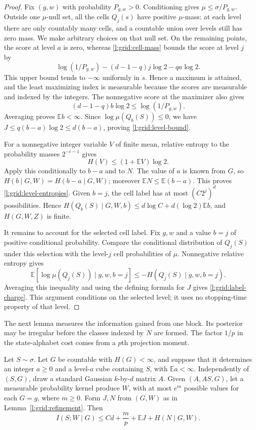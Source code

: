 \begin{proof}
Fix $(g,w)$ with probability $P_{g,w}>0$.  Conditioning gives
$\mu\le\sigma/P_{g,w}$.  Outside one $\mu$-null set, all the cells
$Q_j(s)$ have positive $\mu$-mass: at each level there are only countably
many cells, and a countable union over levels still has zero mass.
We make arbitrary choices on that null set.  On the remaining points,
the score at level $a$ is zero, whereas \eqref{l:grid:cell-mass} bounds
the score at level $j$ by
\[
 \log(1/P_{g,w})-(d-1-q)j\log2-qa\log2.
\]
This upper bound tends to $-\infty$ uniformly in $s$.  Hence a maximum
is attained, and the least maximizing index is measurable because the
scores are measurable and indexed by the integers.  The nonnegative
score at the maximizer also gives
\[
 (d-1-q)b\log2\le\log(1/P_{g,w}).
\]
Averaging proves $\mathbb E b<\infty$.  Since
$\log\mu(Q_b(S))\le0$, we have
$J\le q(b-a)\log2\le d(b-a)$, proving \eqref{l:grid:level-bound}.

For a nonnegative integer variable $V$ of finite mean, relative entropy
to the probability masses $2^{-i-1}$ gives
\[
 H(V)\le(1+\mathbb E V)\log2.
\]
Apply this conditionally to $b-a$ and to $N$.  The value of $a$ is
known from $G$, so $H(b\mid G,W)=H(b-a\mid G,W)$; moreover
$\mathbb E N\le\mathbb E(b-a)$.  This proves
\eqref{l:grid:level-entropies}.  Given $b=j$, the cell label has at
most $(C2^j)^d$ possibilities.  Hence
$H(Q_b(S)\mid G,W,b)\le d\log C+d(\log2)\mathbb E b$, and
$H(G,W,Z)$ is finite.

It remains to account for the selected cell label.  Fix $g,w$ and a
value $b=j$ of positive conditional probability.  Compare the
conditional distribution of $Q_j(S)$ under this selection with the
level-$j$ cell probabilities of $\mu$.  Nonnegative relative entropy
gives
\[
 \mathbb E[\log\mu(Q_j(S))\mid g,w,b=j]
 \le-H(Q_j(S)\mid g,w,b=j).
\]
Averaging this inequality and using the defining formula for $J$ gives
\eqref{l:grid:label-charge}.  This argument conditions on the selected
level; it uses no stopping-time property of that level.
\end{proof}

The next lemma measures the information gained from one block.  Its
posterior may be irregular before the classes indexed by $N$ are formed.
The factor $1/p$ in the state-alphabet cost comes from a $p$th projection
moment.

\begin{lemma}
\label{l:grid:block}
Let $S\sim\sigma$.  Let $G$ be countable with $H(G)<\infty$, and suppose
that it determines an integer $a\ge0$ and a level-$a$ cube containing
$S$, with $\mathbb E a<\infty$.  Independently of $(S,G)$, draw a
standard Gaussian $k$-by-$d$ matrix $A$.  Given $(A,AS,G)$, let a
measurable probability kernel produce $W$, with at most $e^m$ possible
values for each $G=g$, where $m\ge0$.  Form $J,N$ from $(G,W)$ as in
Lemma~\ref{l:grid:refinement}.  Then
\begin{equation}\label{l:grid:block-bound}
 I(S;W\mid G)\le Cd+\frac mp+\mathbb E J+H(N\mid G,W).
\end{equation}
\end{lemma}

